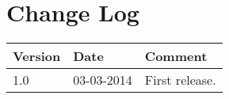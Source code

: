 \documentclass[Main]{subfiles}
\begin{document}
\section*{Change Log}

\begin{table}[H]

\begin{tabular}{p{} p{} p{}}
\hline
\textbf{Version} & \textbf{Date} & \textbf{Comment} \\\hline
1.0 & 03-03-2014 & First release. \\
\hline
\end{tabular}

\end{table}
\end{document}
